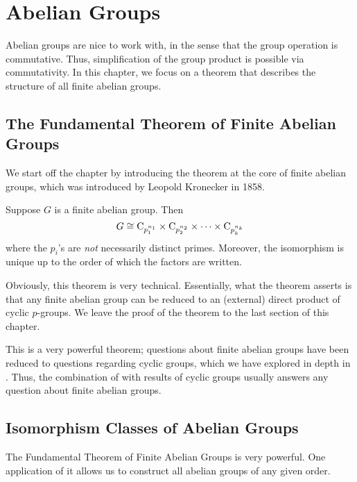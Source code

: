 \chapter{Abelian Groups}
Abelian groups are nice to work with, in the sense that the group operation is commutative. Thus, simplification of the group product is possible via commutativity. In this chapter, we focus on a theorem that describes the structure of all finite abelian groups.

\section{The Fundamental Theorem of Finite Abelian Groups}
We start off the chapter by introducing the theorem at the core of finite abelian groups, which was introduced by Leopold Kronecker in 1858.

\begin{theorem}\label{thrm-fundamental-theorem-finite-abelian-groups}
    Suppose $G$ is a finite abelian group. Then
    \[
        G \cong \mathrm{C}_{p_1^{n_1}} \times \mathrm{C}_{p_2^{n_2}} \times \cdots \times \mathrm{C}_{p_k^{n_k}}
    \]
    where the $p_i$'s are \textit{not} necessarily distinct primes. Moreover, the isomorphism is unique up to the order of which the factors are written.
\end{theorem}

Obviously, this theorem is very technical. Essentially, what the theorem asserts is that any finite abelian group can be reduced to an (external) direct product of cyclic $p$-groups. We leave the proof of the theorem to the last section of this chapter.

This is a very powerful theorem; questions about finite abelian groups have been reduced to questions regarding cyclic groups, which we have explored in depth in . Thus, the combination of  with results of cyclic groups usually answers any question about finite abelian groups.

\section{Isomorphism Classes of Abelian Groups}
The Fundamental Theorem of Finite Abelian Groups is very powerful. One application of it allows us to construct all abelian groups of any given order.

